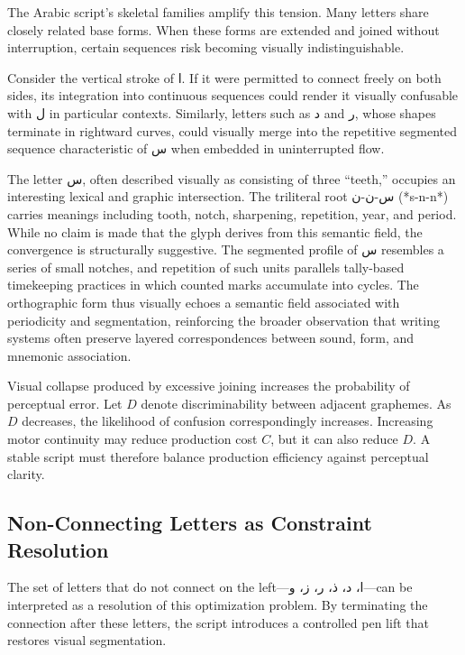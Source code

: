 \documentclass[11pt]{article}
\begin{document}
The Arabic script’s skeletal families amplify this tension. Many letters share closely related base forms. When these forms are extended and joined without interruption, certain sequences risk becoming visually indistinguishable.

Consider the vertical stroke of \textarabic{ا}. If it were permitted to connect freely on both sides, its integration into continuous sequences could render it visually confusable with \textarabic{ل} in particular contexts. Similarly, letters such as \textarabic{د} and \textarabic{ر}, whose shapes terminate in rightward curves, could visually merge into the repetitive segmented sequence characteristic of \textarabic{س} when embedded in uninterrupted flow.

The letter \textarabic{س}, often described visually as consisting of three ``teeth,'' occupies an interesting lexical and graphic intersection. The triliteral root \textarabic{س-ن-ن} (*s-n-n*) carries meanings including tooth, notch, sharpening, repetition, year, and period. While no claim is made that the glyph derives from this semantic field, the convergence is structurally suggestive. The segmented profile of \textarabic{س} resembles a series of small notches, and repetition of such units parallels tally-based timekeeping practices in which counted marks accumulate into cycles. The orthographic form thus visually echoes a semantic field associated with periodicity and segmentation, reinforcing the broader observation that writing systems often preserve layered correspondences between sound, form, and mnemonic association.

Visual collapse produced by excessive joining increases the probability of perceptual error. Let $D$ denote discriminability between adjacent graphemes. As $D$ decreases, the likelihood of confusion correspondingly increases. Increasing motor continuity may reduce production cost $C$, but it can also reduce $D$. A stable script must therefore balance production efficiency against perceptual clarity.

\subsection{Non-Connecting Letters as Constraint Resolution}

The set of letters that do not connect on the left—\textarabic{ا، د، ذ، ر، ز، و}—can be interpreted as a resolution of this optimization problem. By terminating the connection after these letters, the script introduces a controlled pen lift that restores visual segmentation.
\end{document}
